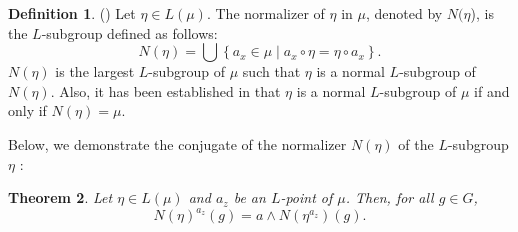 \documentclass[10pt]{article}
\theoremstyle{plain}
\newtheorem{theorem}{Theorem}[section]
\theoremstyle{definition}
\newtheorem{definition}[theorem]{Definition}
\theoremstyle{remark}
\theoremstyle{case}
\begin{document}
\begin{definition}(\cite{ajmal_nor})
	Let $\eta \in L(\mu)$. The normalizer of $\eta$ in $\mu$, denoted by $N(\eta$), is the $L$-subgroup defined as follows:
	\[ N(\eta) = \bigcup \left\{ a_x \in \mu \mid a_x \circ \eta = \eta \circ a_x \right\}. \]
	$N(\eta)$ is the largest $L$-subgroup of $\mu$ such that $\eta$ is a normal $L$-subgroup of $N(\eta)$. Also, it has been established in \cite {ajmal_nor} that  $\eta$ is a normal $L$-subgroup of $\mu$ if and only if $N(\eta)=\mu$.
\end{definition}
\noindent Below, we demonstrate the conjugate of the normalizer $N(\eta)$ of the $L$-subgroup $\eta$ :
\begin{theorem}
	Let $\eta \in L(\mu)$ and $a_z$ be an $L$-point of $\mu$. Then, for all $g \in G$,
	\[ N(\eta)^{a_z}(g) = a \wedge N(\eta^{a_z})(g). \]
\end{theorem}
\end{document}
